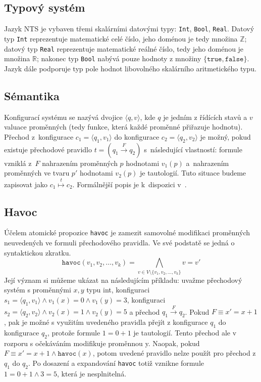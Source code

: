 \documentclass[12pt]{fithesis2}
\newcommand{\tuple}[1]{\langle #1 \rangle}
\begin{document}
\subsection{Typový systém}
Jazyk NTS je vybaven třemi skalárními datovými typy: \texttt{Int}, \texttt{Bool}, \texttt{Real}. Datový typ \texttt{Int} reprezentuje matematické celé číslo, jeho doménou je tedy množina $\mathbb{Z}$; datový typ \texttt{Real} reprezentuje matematické reálné číslo, tedy jeho doménou je množina $\mathbb{R}$; nakonec typ \texttt{Bool} nabývá pouze hodnoty z množiny $\{ \texttt{true}, \texttt{false} \}$. Jazyk dále podporuje typ pole hodnot libovolného skalárního aritmetického typu.

\subsection{Sémantika}
\label{subsec:nts-configuration}

\newcommand{\rulemapsto}[1]{\overset{#1}{\mapsto}}
Konfigurací systému se nazývá dvojice $\tuple{q, v}$, kde $q$ je jedním z řídících stavů a $v$ valuace proměnných (tedy funkce, která každé proměnné přiřazuje hodnotu). Přechod z~konfigurace $c_1 = \tuple{q_1, v_1}$ do konfigurace $c_2 = \tuple{q_2, v_2}$ je možný, pokud existuje přechodové pravidlo $t = \left({q_1 \overset{F}{\rightarrow} q_2}\right)$ s~následující vlastností: formule vzniklá z~$F$ nahrazením proměnných $p$ hodnotami $v_1(p)$ a~nahrazením proměnných ve tvaru $p'$ hodnotami $v_2(p)$ je tautologií. Tuto situace budeme zapisovat jako $c_1 \rulemapsto{t} c_2$. Formálnější popis je k~dispozici v~\cite{NTSref}.

\subsection{Havoc}
\label{subsec:nts-havoc}
Účelem atomické propozice \texttt{havoc} je zamezit samovolné modifikaci proměnných neuvedených ve formuli přechodového pravidla. Ve své podstatě se jedná o syntaktickou zkratku.
\begin{equation}
\texttt{havoc} \left( v_1, v_2, \ldots, v_k \right) = \bigwedge_{v \in V \setminus \{ v_1, v_2, \ldots, v_k \}} v = v'
\end{equation}
Její význam si můžeme ukázat na následujícím příkladu: uvažme přechodový systém s proměnnými $x,y$ typu int, konfiguraci $s_1 = \tuple{q_1, v_1} \land v_1(x) = 0 \land v_1(y) = 3$, konfiguraci $s_2 = \tuple{q_2, v_2} \land v_2(x) = 1 \land v_2(y) = 5$ a přechod $q_1 \overset{F}{\rightarrow} q_2$. Pokud $F \equiv x' = x + 1$, pak je možné s využitím uvedeného pravidla přejít z konfigurace $q_1$ do konfigurace $q_2$, protože formule $1 = 0 + 1$ je tautologií. Tento přechod ale v rozporu s očekáváním modifikuje proměnnou y. Naopak, pokud $F \equiv x' = x + 1 \land \texttt{havoc}(x)$, potom uvedené pravidlo nelze použít pro přechod z $q_1$ do $q_2$. Po dosazení a expandování \texttt{havoc} totiž vznikne formule $1 = 0 + 1 \land 3 = 5$, která je nesplnitelná.
\end{document}
